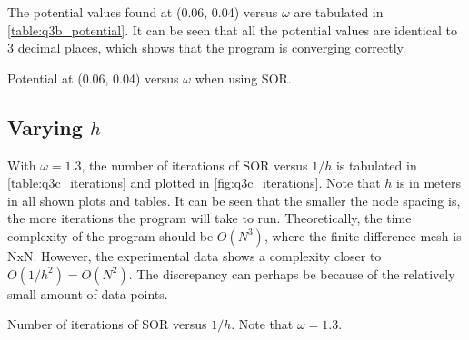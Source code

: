 \documentclass[a4paper,titlepage]{article}
\begin{document}
	The potential values found at (0.06, 0.04) versus $\omega$ are tabulated in \autoref{table:q3b_potential}. It can be seen that all the potential values are identical to 3 decimal places, which shows that the program is converging correctly.

	\begin{table}[!htb]
		\centering
		\caption{Potential at (0.06, 0.04) versus $\omega$ when using SOR.}
		\label{table:q3b_potential}
	\end{table}
	
	\subsection{Varying $h$}
	
	With $\omega = 1.3$, the number of iterations of SOR versus $1/h$ is tabulated in \autoref{table:q3c_iterations} and plotted in \autoref{fig:q3c_iterations}. Note that $h$ is in meters in all shown plots and tables. It can be seen that the smaller the node spacing is, the more iterations the program will take to run. Theoretically, the time complexity of the program should be $O(N^3)$, where the finite difference mesh is NxN. However, the experimental data shows a complexity closer to $O(1/h^2) = O(N^2)$. The discrepancy can perhaps be because of the relatively small amount of data points.
	
	\begin{table}[!htb]
		\centering
		\caption{Number of iterations of SOR versus $1/h$. Note that $\omega=1.3$.}
		\label{table:q3c_iterations}
	\end{table}
	
\end{document}
